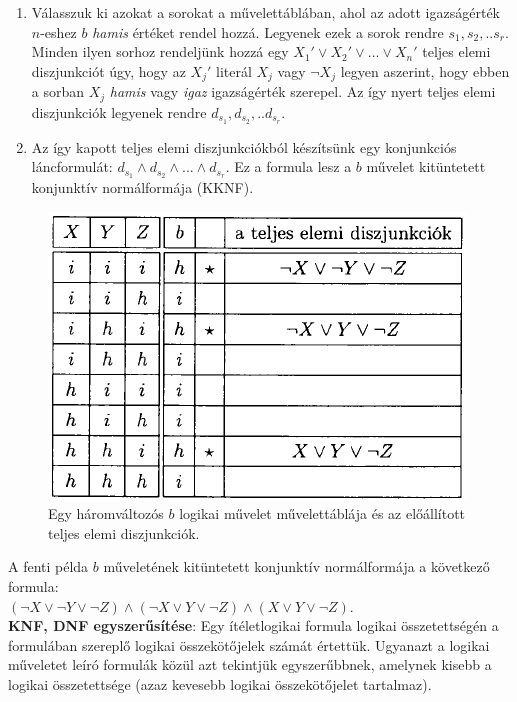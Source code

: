 \documentclass[margin=0px]{article}
\begin{document}
\begin{enumerate}
    \item	Válasszuk ki azokat a sorokat a művelettáblában, ahol az adott igazságérték $n$-eshez $b$ \textit{hamis}
          értéket rendel hozzá. Legyenek ezek a sorok rendre $s_{1}, s_{2}, .. s_{r}$. Minden ilyen sorhoz rendeljünk
          hozzá egy $X_{1}' \vee X_{2}' \vee ... \vee X_{n}'$ teljes elemi diszjunkciót úgy, hogy az $X_{j}'$ literál
          $X_{j}$ vagy $\neg X_{j}$ legyen aszerint, hogy ebben a sorban $X_{j}$ \textit{hamis} vagy \textit{igaz} igazságérték
          szerepel. Az így nyert teljes elemi diszjunkciók legyenek rendre $d_{s_{1}}, d_{s_{2}}, .. d_{s_{r}}$.

    \item	Az így kapott teljes elemi diszjunkciókból készítsünk egy konjunkciós láncformulát:
          $d_{s_{1}} \wedge d_{s_{2}} \wedge ... \wedge d_{s_{r}}$. Ez a formula lesz a $b$ művelet kitüntetett konjunktív
          normálformája (KKNF).
\end{enumerate}

\begin{figure}[H]
    \centering
    \includegraphics[width=0.5\linewidth]{img/kknf_pelda}
    \caption{Egy háromváltozós $b$ logikai művelet művelettáblája és az előállított teljes elemi diszjunkciók.}
    \label{fig:kknf_pelda}
\end{figure}

A fenti példa $b$ műveletének kitüntetett konjunktív normálformája a következő formula:\\
$(\neg X \vee \neg Y \vee \neg Z) \wedge (\neg X \vee Y \vee \neg Z) \wedge (X \vee Y \vee \neg Z)$. \\

\noindent \textbf{KNF, DNF egyszerűsítése}: Egy ítéletlogikai formula logikai összetettségén a formulában szereplő
logikai összekötőjelek számát értettük. Ugyanazt a logikai műveletet leíró formulák közül azt tekintjük egyszerűbbnek,
amelynek kisebb a logikai összetettsége (azaz kevesebb logikai összekötőjelet tartalmaz).
\end{document}
